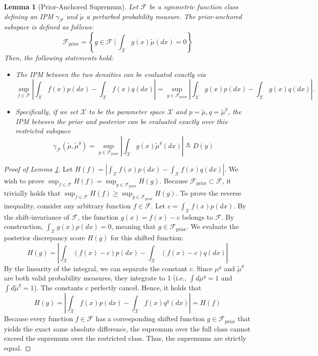 \documentclass[10pt,a4paper]{amsart}
\newtheorem{lem}{Lemma}
\begin{document}
\begin{lem}[Prior-Anchored Supremum] \label{lem:anchor}
    Let $\mathcal{F}$ be a symmetric function class defining an IPM $\gamma_{\mathcal{F}}$ and $\tilde{\mu}$ a perturbed probability measure. The prior-anchored subspace is defined as follows:
    $$\mathcal{F}_{\text{prior}} = \left\{ g \in \mathcal{F} \ \Big| \ \int_{\mathcal{X}} g(x) \tilde{\mu}(dx) = 0 \right\}$$
    Then, the following statements hold:
    \begin{itemize}
        \item The IPM between the two densities can be evaluated exactly via
        $$\sup_{f \in \mathcal{F}} \left| \int_{\mathcal{X}} f(x) p(dx) - \int_{\mathcal{X}} f(x) q(dx) \right| = \sup_{g \in \mathcal{F}_{\text{prior}}} \left| \int_{\mathcal{X}} g(x) p(dx) - \int_{\mathcal{X}} g(x) q(dx) \right|.$$
        \item Specifically, if we set $\mathcal{X}$ to be the parameter space $\mathcal{X}$ and $p=\tilde{\mu}, q=\tilde{\mu}^y$, the IPM between the prior and posterior can be evaluated exactly over this restricted subspace
        $$\gamma_{\mathcal{F}}(\tilde{\mu}, \tilde{\mu}^y) = \sup_{g \in \mathcal{F}_{\text{prior}}} \left| \int_{\mathcal{X}} g(x) \tilde{\mu}^y(dx) \right| \triangleq D(y)$$
    \end{itemize}
\end{lem}

\begin{proof}[Proof of Lemma \ref{lem:anchor}]
    Let $H(f) = \left| \int_{\mathcal{X}} f(x) p(dx) - \int_{\mathcal{X}} f(x) q(dx) \right|$. We wish to prove $\sup_{f \in \mathcal{F}} H(f) = \sup_{g \in \mathcal{F}_{\text{prior}}} H(g)$. Because $\mathcal{F}_{\text{prior}} \subset \mathcal{F}$, it trivially holds that $\sup_{f \in \mathcal{F}} H(f) \ge \sup_{g \in \mathcal{F}_{\text{prior}}} H(g)$. To prove the reverse inequality, consider any arbitrary function $f \in \mathcal{F}$. Let $c = \int_{\mathcal{X}} f(x) p(dx)$. By the shift-invariance of $\mathcal{F}$, the function $g(x) = f(x) - c$ belongs to $\mathcal{F}$. By construction, $\int_{\mathcal{X}} g(x) p(dx) = 0$, meaning that $g \in \mathcal{F}_{\text{prior}}$. We evaluate the posterior discrepancy score $H(g)$ for this shifted function:$$H(g) = \left| \int_{\mathcal{X}} (f(x) - c) p(dx) - \int_{\mathcal{X}} (f(x) - c) q(dx) \right|$$ 
    By the linearity of the integral, we can separate the constant $c$. Since $\mu^y$ and $\tilde{\mu}^y$ are both valid probability measures, they integrate to 1 (i.e., $\int d\mu^y = 1$ and $\int d\tilde{\mu}^y = 1$). The constants $c$ perfectly cancel. Hence, it holds that $$H(g) = \left| \int_{\mathcal{X}} f(x) p(dx) - \int_{\mathcal{X}} f(x) q^y(dx) \right| = H(f)$$
    Because every function $f \in \mathcal{F}$ has a corresponding shifted function $g \in \mathcal{F}_{\text{prior}}$ that yields the exact same absolute difference, the supremum over the full class cannot exceed the supremum over the restricted class. Thus, the supremums are strictly equal.
\end{proof}
\end{document}
